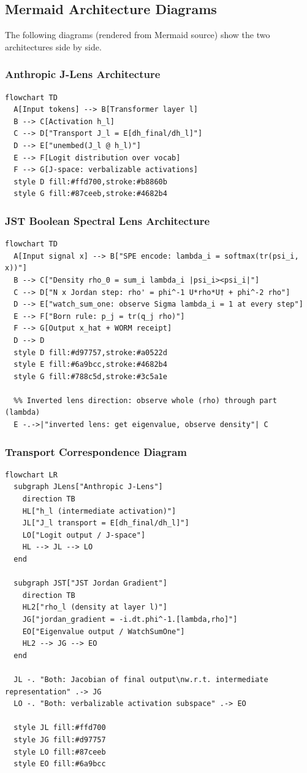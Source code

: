 \documentclass[12pt, letterpaper]{article}
\theoremstyle{plain}
\theoremstyle{definition}
\theoremstyle{remark}
\begin{document}
\subsection{Mermaid Architecture Diagrams}

The following diagrams (rendered from Mermaid source) show the two architectures
side by side.

\subsubsection{Anthropic J-Lens Architecture}

\begin{verbatim}
flowchart TD
  A[Input tokens] --> B[Transformer layer l]
  B --> C[Activation h_l]
  C --> D["Transport J_l = E[dh_final/dh_l]"]
  D --> E["unembed(J_l @ h_l)"]
  E --> F[Logit distribution over vocab]
  F --> G[J-space: verbalizable activations]
  style D fill:#ffd700,stroke:#b8860b
  style G fill:#87ceeb,stroke:#4682b4
\end{verbatim}

\subsubsection{JST Boolean Spectral Lens Architecture}

\begin{verbatim}
flowchart TD
  A[Input signal x] --> B["SPE encode: lambda_i = softmax(tr(psi_i, x))"]
  B --> C["Density rho_0 = sum_i lambda_i |psi_i><psi_i|"]
  C --> D["N x Jordan step: rho' = phi^-1 U*rho*U† + phi^-2 rho"]
  D --> E["watch_sum_one: observe Sigma lambda_i = 1 at every step"]
  E --> F["Born rule: p_j = tr(q_j rho)"]
  F --> G[Output x_hat + WORM receipt]
  D --> D
  style D fill:#d97757,stroke:#a0522d
  style E fill:#6a9bcc,stroke:#4682b4
  style G fill:#788c5d,stroke:#3c5a1e

  %% Inverted lens direction: observe whole (rho) through part (lambda)
  E -.->|"inverted lens: get eigenvalue, observe density"| C
\end{verbatim}

\subsubsection{Transport Correspondence Diagram}

\begin{verbatim}
flowchart LR
  subgraph JLens["Anthropic J-Lens"]
    direction TB
    HL["h_l (intermediate activation)"]
    JL["J_l transport = E[dh_final/dh_l]"]
    LO["Logit output / J-space"]
    HL --> JL --> LO
  end

  subgraph JST["JST Jordan Gradient"]
    direction TB
    HL2["rho_l (density at layer l)"]
    JG["jordan_gradient = -i.dt.phi^-1.[lambda,rho]"]
    EO["Eigenvalue output / WatchSumOne"]
    HL2 --> JG --> EO
  end

  JL -. "Both: Jacobian of final output\nw.r.t. intermediate representation" .-> JG
  LO -. "Both: verbalizable activation subspace" .-> EO

  style JL fill:#ffd700
  style JG fill:#d97757
  style LO fill:#87ceeb
  style EO fill:#6a9bcc
\end{verbatim}
\end{document}

